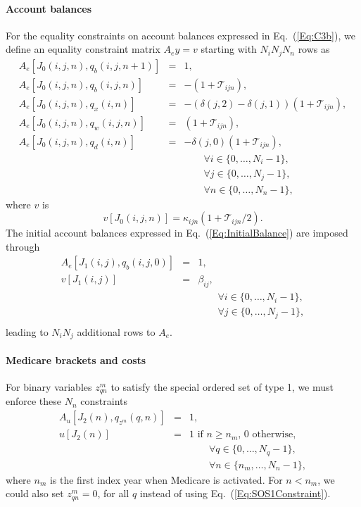 \documentclass{report}[fleqn,11pt]
\begin{document}
\paragraph*{Account balances}
For the equality constraints on account balances expressed in Eq.~(\ref{Eq:C3b}),
we define an equality constraint matrix $A_ey = v$ starting
with $N_iN_jN_n$ rows as
\begin{eqnarray}
	\label{Eq:B1}
	A_e[J_0(i, j, n), q_b(i, j, n+1)] &=& 1, \nonumber \\
	A_e[J_0(i, j, n), q_b(i, j, n)] &=& -(1 + \mathcal{T}_{ijn}), \nonumber \\
	A_e[J_0(i, j, n), q_x(i, n)] &=& -(\delta(j, 2) - \delta(j, 1))(1 + \mathcal{T}_{ijn}), \nonumber \\
	A_e[J_0(i, j, n), q_w(i, j, n)] &=& (1 + \mathcal{T}_{ijn}), \nonumber \\
	A_e[J_0(i, j, n), q_d(i, n)] &=& -\delta(j, 0)(1 + \mathcal{T}_{ijn}), \\
	&&\qquad\forall i \in \{0,\ldots, N_i-1\},\nonumber\\
	&&\qquad\forall j \in \{0,\ldots, N_j-1\},\nonumber\\
	&&\qquad\forall n \in \{0,\ldots, N_n-1\}, \nonumber
\end{eqnarray}
where $v$ is
\begin{equation}
	v[J_0(i, j, n)] = \kappa_{ijn}(1 + \mathcal{T}_{ijn}/2).
\end{equation}
The initial account balances expressed in Eq.~(\ref{Eq:InitialBalance}) are imposed through
\begin{eqnarray}
	A_e[J_1(i, j), q_b(i, j, 0)] &=& 1, \nonumber \\
	v[J_1(i, j)] &=& \beta_{ij},  \\
	&&\qquad\forall i \in \{0,\ldots, N_i-1\},\nonumber\\
	&&\qquad\forall j \in \{0,\ldots, N_j-1\},\nonumber\\
\end{eqnarray}
leading to $N_i N_j$ additional rows to $A_e$.

\paragraph*{Medicare brackets and costs}
For binary variables $z_{qn}^m$ to satisfy
the special ordered set of type 1, we must enforce these $N_n$ constraints
\begin{eqnarray}
	\label{Eq:SOS1Constraint}
	A_u[J_2(n), q_{z^m}(q, n)] &=& 1, \nonumber \\
	u[J_2(n)] &=& \text{1 if $n \ge n_m$, 0 otherwise},\\
	&&\qquad\forall q \in \{0,\ldots, N_q - 1\}, \nonumber\\
	&&\qquad\forall n \in \{n_m,\ldots, N_n - 1\},\nonumber
\end{eqnarray}
where $n_m$ is the first index year when Medicare is activated.
For $n < n_m$, we could also set $z_{qn}^m = 0$,
for all $q$ instead of using Eq.~(\ref{Eq:SOS1Constraint}).
\end{document}
